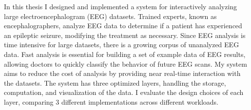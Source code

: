 % 
% 
%

In this thesis I designed and implemented a system for interactively analyzing
large electroencephalogram (EEG) datasets. Trained experts, known as
encephalographers, analyze EEG data to determine if a patient has experienced
an epileptic seizure, modifying the treatment as necessary. Since EEG analysis
is time intensive for large datasets, there is a growing corpus of unanalyzed
EEG data. Fast analysis is essential for building a set of example data of EEG
results, allowing doctors to quickly classify the behavior of future EEG scans.
My system aims to reduce the cost of analysis by providing near real-time
interaction with the datasets. The system has three optimized layers, handling
the storage, computation, and visualization of the data. I evaluate the design
choices of each layer, comparing 3 different implementations across different
workloads.
